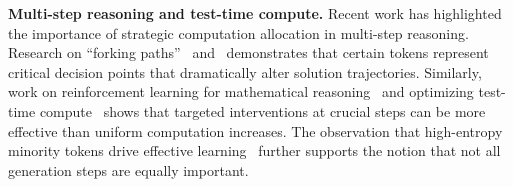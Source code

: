 \documentclass{article}
\theoremstyle{plain}
\theoremstyle{definition}
\theoremstyle{remark}
\begin{document}
\textbf{Multi-step reasoning and test-time compute.} Recent work has highlighted the importance of strategic computation allocation in multi-step reasoning. Research on ``forking paths''~\citep{fork} and~\citep{qwen80/20} demonstrates that certain tokens represent critical decision points that dramatically alter solution trajectories. Similarly, work on reinforcement learning for mathematical reasoning~\citep{setlur2024rl, deepseekai2025deepseekr1incentivizingreasoningcapability, yang2025qwen3technicalreport, kimiteam2025kimik2openagentic, gpo, criticaltokens} 
and optimizing test-time compute~\citep{snell2024scaling, qu-mrt} 
shows that targeted interventions at crucial steps can be more effective than uniform computation increases. The observation that high-entropy minority tokens drive effective learning~\citep{qwen80/20} further supports the notion that not all generation steps are equally important.
\end{document}

